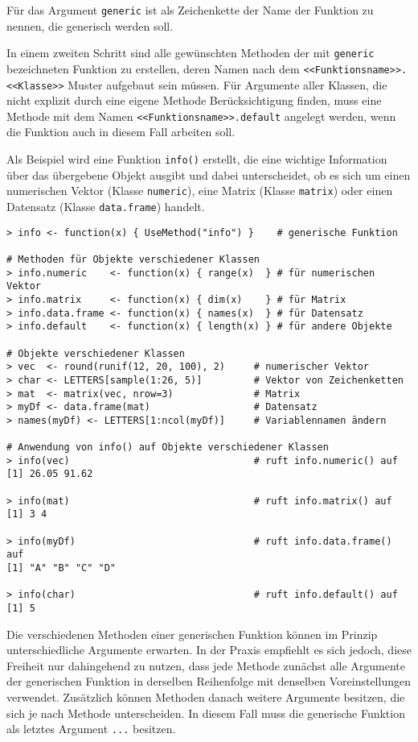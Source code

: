 Für das Argument \lstinline!generic! ist als Zeichenkette der Name der Funktion zu nennen, die generisch werden soll.

In einem zweiten Schritt sind alle gewünschten Methoden der mit \lstinline!generic! bezeichneten Funktion zu erstellen, deren Namen nach dem \lstinline!<<Funktionsname>>.<<Klasse>>! Muster aufgebaut sein müssen. Für Argumente aller Klassen, die nicht explizit durch eine eigene Methode Berücksichtigung finden, muss eine Methode mit dem Namen \lstinline!<<Funktionsname>>.default! angelegt werden, wenn die Funktion auch in diesem Fall arbeiten soll.

Als Beispiel wird eine Funktion \lstinline!info()! erstellt, die eine wichtige Information über das übergebene Objekt ausgibt und dabei unterscheidet, ob es sich um einen numerischen Vektor (Klasse \lstinline!numeric!), eine Matrix (Klasse \lstinline!matrix!) oder einen Datensatz (Klasse \lstinline!data.frame!) handelt.
\begin{lstlisting}
> info <- function(x) { UseMethod("info") }    # generische Funktion

# Methoden für Objekte verschiedener Klassen
> info.numeric    <- function(x) { range(x)  } # für numerischen Vektor
> info.matrix     <- function(x) { dim(x)    } # für Matrix
> info.data.frame <- function(x) { names(x)  } # für Datensatz
> info.default    <- function(x) { length(x) } # für andere Objekte

# Objekte verschiedener Klassen
> vec  <- round(runif(12, 20, 100), 2)     # numerischer Vektor
> char <- LETTERS[sample(1:26, 5)]         # Vektor von Zeichenketten
> mat  <- matrix(vec, nrow=3)              # Matrix
> myDf <- data.frame(mat)                  # Datensatz
> names(myDf) <- LETTERS[1:ncol(myDf)]     # Variablennamen ändern

# Anwendung von info() auf Objekte verschiedener Klassen
> info(vec)                                # ruft info.numeric() auf
[1] 26.05 91.62

> info(mat)                                # ruft info.matrix() auf
[1] 3 4

> info(myDf)                               # ruft info.data.frame() auf
[1] "A" "B" "C" "D"

> info(char)                               # ruft info.default() auf
[1] 5
\end{lstlisting}

Die verschiedenen Methoden einer generischen Funktion können im Prinzip unterschiedliche Argumente erwarten. In der Praxis empfiehlt es sich jedoch, diese Freiheit nur dahingehend zu nutzen, dass jede Methode zunächst alle Argumente der generischen Funktion in derselben Reihenfolge mit denselben Voreinstellungen verwendet. Zusätzlich können Methoden danach weitere Argumente besitzen, die sich je nach Methode unterscheiden. In diesem Fall muss die generische Funktion als letztes Argument \lstinline!...! besitzen.

